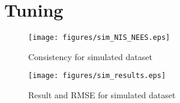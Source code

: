\section{Tuning}\label{sec:tuning}


\begin{figure}
    \centering
    \texttt{[image: figures/sim\_NIS\_NEES.eps]}
    \caption{Consistency for simulated dataset}
	\label{fig:1_1}
\end{figure}
\begin{figure}
    \centering
    \texttt{[image: figures/sim\_results.eps]}
    \caption{Result and RMSE for simulated dataset}
	\label{fig:1_2}
\end{figure}